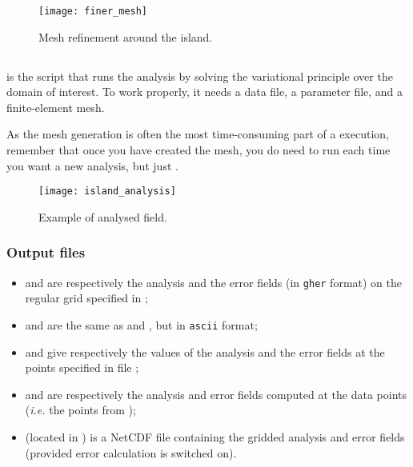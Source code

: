 \begin{figure}[htpb]
\centering
\texttt{[image: finer\_mesh]}
\caption{Mesh refinement around the island.\label{fig:square}}
\end{figure}



\subsection{\label{sec:divacalc}}

 is the script that runs the analysis by solving the variational principle over the domain of interest. To work properly, it needs a data file, a parameter file, and a finite-element mesh.

\btips
As the mesh generation is often the most time-consuming part of a \diva execution, remember that once you have created the mesh, you do need to run  each time you want a new analysis, but just .
\etips

\begin{figure}[H]
\centering
\parbox{.7\textwidth}{
\texttt{[image: island\_analysis]}
}\parbox{.3\textwidth}{
\caption{Example of analysed field.}
}
\end{figure}


\subsubsection{Output files}

\begin{itemize}
\item {} and  are respectively the analysis and the error fields (in \texttt{gher} format) on the regular grid specified in ;
\item {} and  are the same as  and , but in \texttt{ascii} format;
\item {} and  give respectively the values of the analysis and the error fields at the points specified in file ;
\item {} and  are respectively the analysis and error fields computed at the data points (\textit{i.e.} the points from );
\item {} (located in ) is a NetCDF  file containing the gridded analysis and error fields (provided error calculation is switched on).
\end{itemize}



